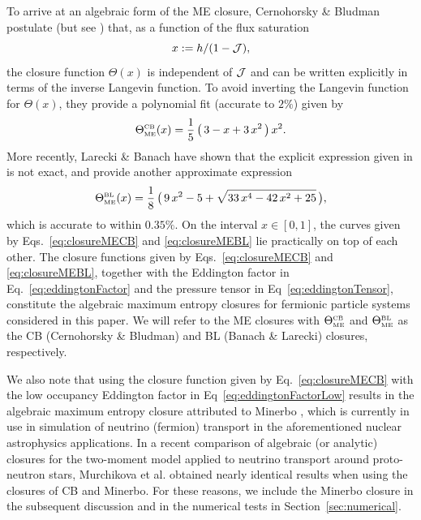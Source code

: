 To arrive at an algebraic form of the ME closure, Cernohorsky \& Bludman \cite{cernohorskyBludman_1994} postulate (but see \cite{lareckiBanach_2011}) that, as a function of the flux saturation
\begin{equation}
  x := h/(1-\mathcal{J}),
  \label{eq:fluxSaturation}
\end{equation} 
the closure function $\Theta(x)$ is independent of $\mathcal{J}$ and can be written explicitly in terms of the inverse Langevin function.  
To avoid inverting the Langevin function for $\Theta(x)$, they provide a polynomial fit (accurate to $2\%$) given by
\begin{equation}
  \Theta_{\mbox{\tiny ME}}^{\mbox{\tiny CB}}(x)
  =\frac{1}{5}\,\big(\,3-x+3\,x^{2}\,\big)\,x^{2}.
  \label{eq:closureMECB}
\end{equation}
More recently, Larecki \& Banach \cite{lareckiBanach_2011} have shown that the explicit expression given in \cite{cernohorskyBludman_1994} is not exact, and provide another approximate expression
\begin{equation}
  \Theta_{\mbox{\tiny ME}}^{\mbox{\tiny BL}}(x)
  =\frac{1}{8}\,\big(\,9\,x^{2}-5+\sqrt{33\,x^{4}-42\,x^{2}+25}\,\big),
  \label{eq:closureMEBL}
\end{equation}
which is accurate to within $0.35\%$.  
On the interval $x\in[0,1]$, the curves given by Eqs.~\eqref{eq:closureMECB} and \eqref{eq:closureMEBL} lie practically on top of each other.  
The closure functions given by Eqs.~\eqref{eq:closureMECB} and \eqref{eq:closureMEBL}, together with the Eddington factor in Eq.~\eqref{eq:eddingtonFactor} and the pressure tensor in Eq~\eqref{eq:eddingtonTensor}, constitute the algebraic maximum entropy closures for fermionic particle systems considered in this paper.  
We will refer to the ME closures with $\Theta_{\mbox{\tiny ME}}^{\mbox{\tiny CB}}$ and $\Theta_{\mbox{\tiny ME}}^{\mbox{\tiny BL}}$ as the CB (Cernohorsky \& Bludman) and BL (Banach \& Larecki) closures, respectively.  

We also note that using the closure function given by Eq.~\eqref{eq:closureMECB} with the low occupancy Eddington factor in Eq~\eqref{eq:eddingtonFactorLow} results in the algebraic maximum entropy closure attributed to Minerbo \cite{minerbo_1978}, which is currently in use in simulation of neutrino (fermion) transport in the aforementioned nuclear astrophysics applications.  
In a recent comparison of algebraic (or analytic) closures for the two-moment model applied to neutrino transport around proto-neutron stars, Murchikova et al. \cite{murchikova_etal_2017} obtained nearly identical results when using the closures of CB and Minerbo.  
For these reasons, we include the Minerbo closure in the subsequent discussion and in the numerical tests in Section~\ref{sec:numerical}.  

